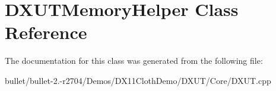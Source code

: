 \hypertarget{class_d_x_u_t_memory_helper}{\section{D\+X\+U\+T\+Memory\+Helper Class Reference}
\label{class_d_x_u_t_memory_helper}
}


The documentation for this class was generated from the following file\+:\begin{DoxyCompactItemize}
\item 
bullet/bullet-\/2.-\/r2704/\+Demos/\+D\+X11\+Cloth\+Demo/\+D\+X\+U\+T/\+Core/D\+X\+U\+T.\+cpp\end{DoxyCompactItemize}
